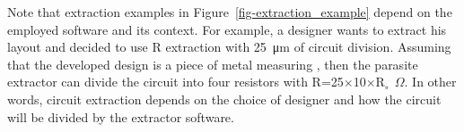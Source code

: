 
Note that extraction examples in Figure~\ref{fig-extraction_example} depend on the employed software and its context. For example, a designer wants to extract his layout and decided to use R extraction with \SI{25}{\micro\metre} of circuit division. Assuming that the developed design is a piece of metal measuring , then the parasite extractor can divide the circuit into four resistors with R=\num{25}$\times$\num{10}$\times$R\textsubscript{$\square$}~$\Omega$. In other words, circuit extraction depends on the choice of designer and how the circuit will be divided by the extractor software.


